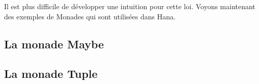 Il est plus difficile de développer une intuition pour cette loi. Voyons
maintenant des exemples de Monades qui sont utilisées dans Hana.


\subsection{La monade Maybe}


\subsection{La monade Tuple}
